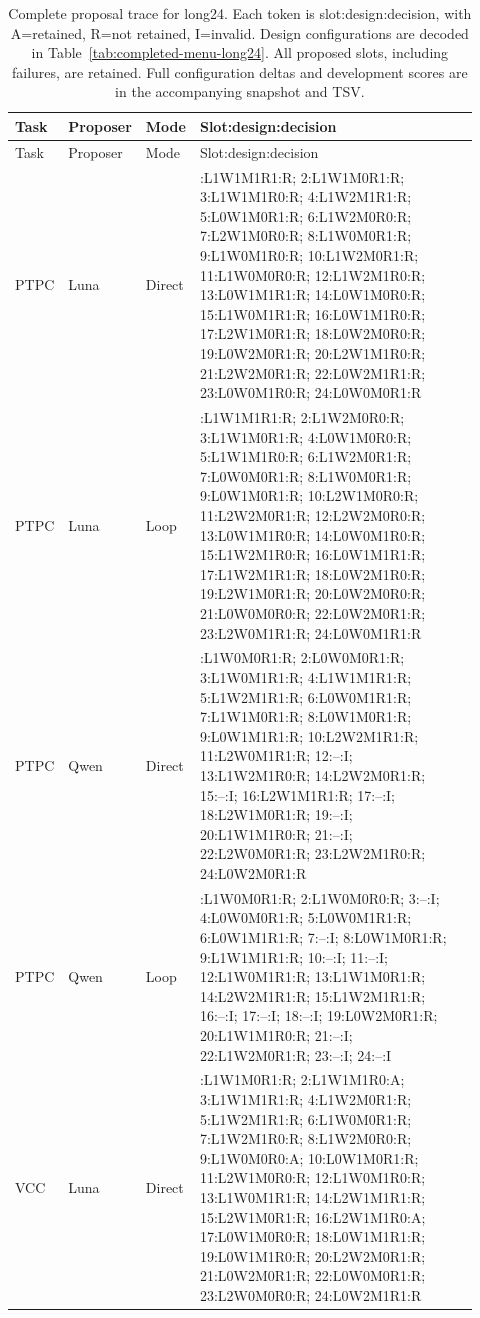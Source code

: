 \begingroup\small
\setlength{\tabcolsep}{3pt}
\begin{longtable}{@{}p{0.10\linewidth}p{0.08\linewidth}p{0.08\linewidth}>{\raggedright\arraybackslash}p{0.66\linewidth}@{}}
\caption{Complete proposal trace for long24. Each token is slot:design:decision, with A=retained, R=not retained, I=invalid. Design configurations are decoded in Table~\ref{tab:completed-menu-long24}. All proposed slots, including failures, are retained. Full configuration deltas and development scores are in the accompanying snapshot and TSV.}\label{tab:completed-trace-long24}\\
\toprule Task & Proposer & Mode & Slot:design:decision \\ \midrule\endfirsthead
\toprule Task & Proposer & Mode & Slot:design:decision \\ \midrule\endhead
\bottomrule\endfoot
PTPC & Luna & Direct & 1:L1W1M1R1:R; 2:L1W1M0R1:R; 3:L1W1M1R0:R; 4:L1W2M1R1:R; 5:L0W1M0R1:R; 6:L1W2M0R0:R; 7:L2W1M0R0:R; 8:L1W0M0R1:R; 9:L1W0M1R0:R; 10:L1W2M0R1:R; 11:L1W0M0R0:R; 12:L1W2M1R0:R; 13:L0W1M1R1:R; 14:L0W1M0R0:R; 15:L1W0M1R1:R; 16:L0W1M1R0:R; 17:L2W1M0R1:R; 18:L0W2M0R0:R; 19:L0W2M0R1:R; 20:L2W1M1R0:R; 21:L2W2M0R1:R; 22:L0W2M1R1:R; 23:L0W0M1R0:R; 24:L0W0M0R1:R \\[3pt]
PTPC & Luna & Loop & 1:L1W1M1R1:R; 2:L1W2M0R0:R; 3:L1W1M0R1:R; 4:L0W1M0R0:R; 5:L1W1M1R0:R; 6:L1W2M0R1:R; 7:L0W0M0R1:R; 8:L1W0M0R1:R; 9:L0W1M0R1:R; 10:L2W1M0R0:R; 11:L2W2M0R1:R; 12:L2W2M0R0:R; 13:L0W1M1R0:R; 14:L0W0M1R0:R; 15:L1W2M1R0:R; 16:L0W1M1R1:R; 17:L1W2M1R1:R; 18:L0W2M1R0:R; 19:L2W1M0R1:R; 20:L0W2M0R0:R; 21:L0W0M0R0:R; 22:L0W2M0R1:R; 23:L2W0M1R1:R; 24:L0W0M1R1:R \\[3pt]
PTPC & Qwen & Direct & 1:L1W0M0R1:R; 2:L0W0M0R1:R; 3:L1W0M1R1:R; 4:L1W1M1R1:R; 5:L1W2M1R1:R; 6:L0W0M1R1:R; 7:L1W1M0R1:R; 8:L0W1M0R1:R; 9:L0W1M1R1:R; 10:L2W2M1R1:R; 11:L2W0M1R1:R; 12:--:I; 13:L1W2M1R0:R; 14:L2W2M0R1:R; 15:--:I; 16:L2W1M1R1:R; 17:--:I; 18:L2W1M0R1:R; 19:--:I; 20:L1W1M1R0:R; 21:--:I; 22:L2W0M0R1:R; 23:L2W2M1R0:R; 24:L0W2M0R1:R \\[3pt]
PTPC & Qwen & Loop & 1:L1W0M0R1:R; 2:L1W0M0R0:R; 3:--:I; 4:L0W0M0R1:R; 5:L0W0M1R1:R; 6:L0W1M1R1:R; 7:--:I; 8:L0W1M0R1:R; 9:L1W1M1R1:R; 10:--:I; 11:--:I; 12:L1W0M1R1:R; 13:L1W1M0R1:R; 14:L2W2M1R1:R; 15:L1W2M1R1:R; 16:--:I; 17:--:I; 18:--:I; 19:L0W2M0R1:R; 20:L1W1M1R0:R; 21:--:I; 22:L1W2M0R1:R; 23:--:I; 24:--:I \\[3pt]
VCC & Luna & Direct & 1:L1W1M0R1:R; 2:L1W1M1R0:A; 3:L1W1M1R1:R; 4:L1W2M0R1:R; 5:L1W2M1R1:R; 6:L1W0M0R1:R; 7:L1W2M1R0:R; 8:L1W2M0R0:R; 9:L1W0M0R0:A; 10:L0W1M0R1:R; 11:L2W1M0R0:R; 12:L1W0M1R0:R; 13:L1W0M1R1:R; 14:L2W1M1R1:R; 15:L2W1M0R1:R; 16:L2W1M1R0:A; 17:L0W1M0R0:R; 18:L0W1M1R1:R; 19:L0W1M1R0:R; 20:L2W2M0R1:R; 21:L0W2M0R1:R; 22:L0W0M0R1:R; 23:L2W0M0R0:R; 24:L0W2M1R1:R \\[3pt]

\end{longtable}
